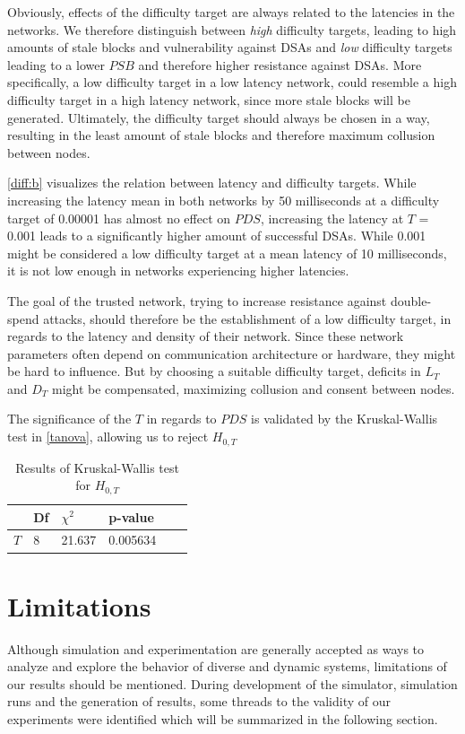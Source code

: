 \documentclass[a4paper,12pt,twoside]{report}
\begin{document}
Obviously, effects of the difficulty target are always related to the latencies in the networks. We therefore distinguish between \textit{high} difficulty targets, leading to high amounts of stale blocks and vulnerability against DSAs and \textit{low} difficulty targets leading to a lower $PSB$ and therefore higher resistance against DSAs. More specifically, a low difficulty target in a low latency network, could resemble a high difficulty target in a high latency network, since more stale blocks will be generated. Ultimately, the difficulty target should always be chosen in a way, resulting in the least amount of stale blocks and therefore maximum collusion between nodes.

\autoref{diff:b} visualizes the relation between latency and difficulty targets. While increasing the latency mean in both networks by 50 milliseconds at a difficulty target of 0.00001 has almost no effect on $PDS$, increasing the latency at $T$ = 0.001 leads to a significantly higher amount of successful DSAs. While 0.001 might be considered a low difficulty target at a mean latency of 10 milliseconds, it is not low enough in networks experiencing higher latencies. 

The goal of the trusted network, trying to increase resistance against double-spend attacks, should therefore be the establishment of a low difficulty target, in regards to the latency and density of their network. Since these network parameters often depend on communication architecture or hardware, they might be hard to influence. But by choosing a suitable difficulty target, deficits in $L_{T}$ and $D_{T}$ might be compensated, maximizing collusion and consent between nodes.

The significance of the $T$ in regards to $PDS$ is validated by the Kruskal-Wallis test in \autoref{tanova}, allowing us to reject $H_{0,T}$
\begin{table}[hb]
\centering
\begin{tabular}{|l|l|l|l|l|l|} \hline
& Df & $\chi^{2}$ & p-value \\ \hline
$T$ & 8 &  21.637 & 0.005634 \\ \hline
\end{tabular}
\caption{Results of Kruskal-Wallis test for $H_{0,T}$}
\label{tanova}
\end{table}

\section{Limitations}
Although simulation and experimentation are generally accepted as ways to analyze
and explore the behavior of diverse and dynamic systems, limitations of our results should be mentioned. During development of the simulator, simulation runs and the generation of results, some threads to the validity of our experiments were identified which will be summarized in the following section. 
\end{document}
